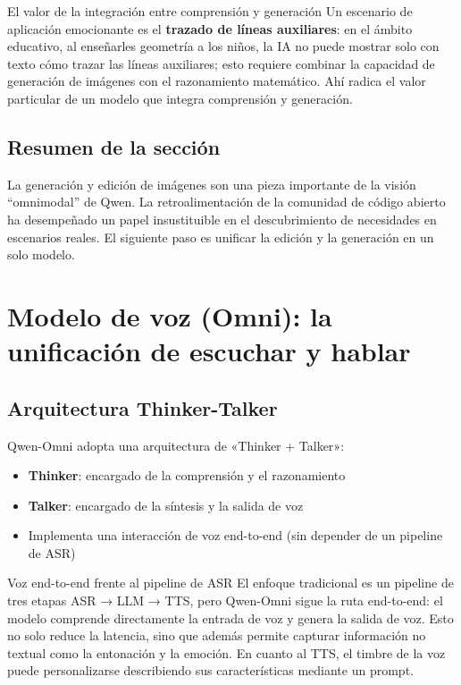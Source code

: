 \documentclass[a4paper]{article}
\begin{document}
\begin{knowledgebox}{El valor de la integración entre comprensión y generación}
Un escenario de aplicación emocionante es el \textbf{trazado de líneas auxiliares}: en el ámbito educativo, al enseñarles geometría a los niños, la IA no puede mostrar solo con texto cómo trazar las líneas auxiliares; esto requiere combinar la capacidad de generación de imágenes con el razonamiento matemático. Ahí radica el valor particular de un modelo que integra comprensión y generación.
\end{knowledgebox}

\subsection{Resumen de la sección}

La generación y edición de imágenes son una pieza importante de la visión ``omnimodal'' de Qwen. La retroalimentación de la comunidad de código abierto ha desempeñado un papel insustituible en el descubrimiento de necesidades en escenarios reales. El siguiente paso es unificar la edición y la generación en un solo modelo.
\section{Modelo de voz (Omni): la unificación de escuchar y hablar}

\subsection{Arquitectura Thinker-Talker}

Qwen-Omni adopta una arquitectura de «Thinker + Talker»:

\begin{itemize}
    \item \textbf{Thinker}: encargado de la comprensión y el razonamiento
    \item \textbf{Talker}: encargado de la síntesis y la salida de voz
    \item Implementa una interacción de voz end-to-end (sin depender de un pipeline de ASR)
\end{itemize}

\begin{knowledgebox}{Voz end-to-end frente al pipeline de ASR}
El enfoque tradicional es un pipeline de tres etapas ASR → LLM → TTS, pero Qwen-Omni sigue la ruta end-to-end: el modelo comprende directamente la entrada de voz y genera la salida de voz. Esto no solo reduce la latencia, sino que además permite capturar información no textual como la entonación y la emoción. En cuanto al TTS, el timbre de la voz puede personalizarse describiendo sus características mediante un prompt.
\end{knowledgebox}
\end{document}
